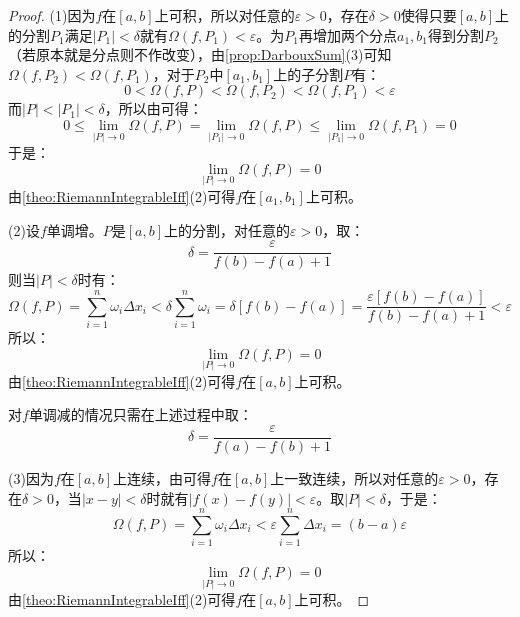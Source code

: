 \begin{proof}
	(1)因为$f$在$[a,b]$上可积，所以对任意的$\varepsilon>0$，存在$\delta>0$使得只要$[a,b]$上的分割$P_1$满足$|P_1|<\delta$就有$\Omega(f,P_1)<\varepsilon$。为$P_1$再增加两个分点$a_1,b_1$得到分割$P_2$（若原本就是分点则不作改变），由\cref{prop:DarbouxSum}(3)可知$\Omega(f,P_2)<\Omega(f,P_1)$，对于$P_2$中$[a_1,b_1]$上的子分割$P$有：
	\begin{equation*}
		0<\Omega(f,P)<\Omega(f,P_2)<\Omega(f,P_1)<\varepsilon
	\end{equation*}
	而$|P|<|P_1|<\delta$，所以由可得：
	\begin{equation*}
		0\leqslant\lim_{|P|\to0}\Omega(f,P)=\lim_{|P_1|\to0}\Omega(f,P)\leqslant\lim_{|P_1|\to0}\Omega(f,P_1)=0
	\end{equation*}
	于是：
	\begin{equation*}
		\lim_{|P|\to0}\Omega(f,P)=0
	\end{equation*}
	由\cref{theo:RiemannIntegrableIff}(2)可得$f$在$[a_1,b_1]$上可积。\par
	(2)设$f$单调增。$P$是$[a,b]$上的分割，对任意的$\varepsilon>0$，取：
	\begin{equation*}
		\delta=\frac{\varepsilon}{f(b)-f(a)+1}
	\end{equation*}
	则当$|P|<\delta$时有：
	\begin{equation*}
		\Omega(f,P)=\sum_{i=1}^{n}\omega_i\Delta x_i<\delta\sum_{i=1}^{n}\omega_i=\delta[f(b)-f(a)]=\frac{\varepsilon[f(b)-f(a)]}{f(b)-f(a)+1}<\varepsilon
	\end{equation*}
	所以：
	\begin{equation*}
		\lim_{|P|\to0}\Omega(f,P)=0
	\end{equation*}
	由\cref{theo:RiemannIntegrableIff}(2)可得$f$在$[a,b]$上可积。\par
	对$f$单调减的情况只需在上述过程中取：
	\begin{equation*}
		\delta=\frac{\varepsilon}{f(a)-f(b)+1}
	\end{equation*}\par
	(3)因为$f$在$[a,b]$上连续，由可得$f$在$[a,b]$上一致连续，所以对任意的$\varepsilon>0$，存在$\delta>0$，当$|x-y|<\delta$时就有$|f(x)-f(y)|<\varepsilon$。取$|P|<\delta$，于是：
	\begin{equation*}
		\Omega(f,P)=\sum_{i=1}^{n}\omega_i\Delta x_i<\varepsilon\sum_{i=1}^{n}\Delta x_i=(b-a)\varepsilon
	\end{equation*}
	所以：
	\begin{equation*}
		\lim_{|P|\to0}\Omega(f,P)=0
	\end{equation*}
	由\cref{theo:RiemannIntegrableIff}(2)可得$f$在$[a,b]$上可积。\par
\end{proof}

